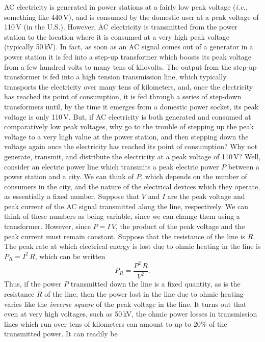 AC electricity is generated in power stations at a fairly low peak voltage
({\em i.e.}, something like 440\,V), and is consumed by the domestic
user at a peak voltage of 110\,V (in the U.S.). However, AC electricity
is transmitted from the power station to the location where it is consumed
at a very high peak voltage (typically 50\,kV). In fact, as soon as an AC signal
comes out of a generator in a power station it is fed into a step-up
transformer which boosts its peak voltage from a few hundred volts to many tens
of kilovolts. The output from the step-up transformer is fed into a
high tension transmission line, which typically transports the electricity over
many tens of kilometers, and, once the electricity has reached its
point of consumption, it is fed through a series of step-down transformers
until, by the time it emerges from a domestic power socket, its peak voltage is
only 110\,V. But, if AC electricity is both generated and consumed at
comparatively low peak voltages, why go to the trouble of
stepping up the peak voltage to a very high value at the
power station, and then stepping down the voltage again once the electricity
has reached its point of consumption? Why not generate, transmit, and
distribute the electricity at a peak voltage of 110\,V?
Well, consider an electric
power line which transmits a peak electric power $P$ between a power station
and  a city. We can think of $P$, which
depends on the number of consumers in the city, and the nature of the
electrical devices which they operate, as essentially a fixed number.
Suppose that $V$ and $I$ are the peak voltage and peak current 
of the AC signal transmitted along the line,
respectively. We can think of these numbers as being variable, since we can change
them using a transformer. However, since $P=I \,V$, the product of the peak 
voltage and the peak current must remain constant. Suppose that the resistance
of the line is $R$. The peak rate at which electrical energy is lost due
to ohmic heating in the line is $P_R= I^2 \,R$, which can be written
\begin{equation}
P_R = \frac{P^2\,R}{V^2}.
\end{equation}
Thus, if the power $P$ transmitted down the line is a fixed quantity, 
as is the resistance $R$ of the line, then the
power lost in the line due to ohmic heating varies like the {\em inverse square}\/
 of
the peak voltage in the line. It turns out that even at very high voltages,
such as 50\,kV, the ohmic power losses in 
transmission lines which run over tens of kilometers
can amount to up to 20\% of the transmitted power. It can readily be
